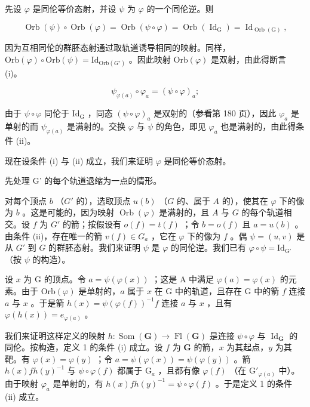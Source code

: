先设 \(\varphi\) 是同伦等价态射，并设 \(\psi\) 为 \(\varphi\) 的一个同伦逆。则

\[
\operatorname{Orb} (\psi) \circ \operatorname{Orb} (\varphi) = \operatorname{Orb} (\psi \circ \varphi) = \operatorname{Orb} (\operatorname{Id} _ {\mathrm{G}}) = \operatorname{Id} _ {\operatorname{Orb} (\mathrm{G})},
\]

因为互相同伦的群胚态射通过取轨道诱导相同的映射。同样，\(\mathrm{Orb}(\varphi) \circ \mathrm{Orb}(\psi) = \mathrm{Id}_{\mathrm{Orb}(G')}\) 。因此映射 \(\mathrm{Orb}(\varphi)\) 是双射，由此得断言 (i)。

\[
\psi_ {\varphi (a)} \circ \varphi_ {a} = (\psi \circ \varphi) _ {a};
\]

由于 \(\psi \circ \varphi\) 同伦于 \(\mathrm{Id}_{\mathrm{G}}\) ，同态 \((\psi \circ \varphi)_a\) 是双射的（参看第 180 页），因此 \(\varphi_a\) 是单射的而 \(\psi_{\varphi(a)}\) 是满射的。交换 \(\varphi\) 与 \(\psi\) 的角色，即见 \(\varphi_a\) 也是满射的，由此得条件 (ii)。

现在设条件 (i) 与 (ii) 成立，我们来证明 \(\varphi\) 是同伦等价态射。

先处理 G' 的每个轨道退缩为一点的情形。

对每个顶点 \(b\) （\(G'\) 的），选取顶点 \(u(b)\) （\(G\) 的、属于 \(A\) 的），使其在 \(\varphi\) 下的像为 \(b\) 。这是可能的，因为映射 \(\operatorname{Orb}(\varphi)\) 是满射的，且 \(A\) 与 \(G\) 的每个轨道相交。设 \(f\) 为 \(G'\) 的箭；按假设有 \(o(f) = t(f)\) ；令 \(b = o(f)\) 且 \(a = u(b)\) 。由条件 (ii)，存在唯一的箭 \(v(f) \in G_a\) ，它在 \(\varphi\) 下的像为 \(f\) 。偶 \(\psi = (u, v)\) 是从 \(G'\) 到 \(G\) 的群胚态射。我们来证明 \(\psi\) 是 \(\varphi\) 的同伦逆。我们已有 \(\varphi \circ \psi = \mathrm{Id}_{\mathrm{G}'}\) （按 \(\psi\) 的构造）。

设 \(x\) 为 G 的顶点。令 \(a = \psi(\varphi(x))\) ；这是 A 中满足 \(\varphi(a) = \varphi(x)\) 的元素。由于 \(\mathrm{Orb}(\varphi)\) 是单射的，\(a\) 属于 \(x\) 在 G 中的轨道，且存在 G 中的箭 \(f\) 连接 \(a\) 与 \(x\) 。于是箭 \(h(x) = \psi(\varphi(f))^{-1}f\) 连接 \(a\) 与 \(x\) ，且有 \(\varphi(h(x)) = e_{\varphi(a)}\) 。

我们来证明这样定义的映射 \(h \colon \operatorname{Som}(\mathbf{G}) \to \operatorname{Fl}(\mathbf{G})\) 是连接 \(\psi \circ \varphi\) 与 \(\operatorname{Id}_{\mathbf{G}}\) 的同伦。按构造，定义 1 的条件 (i) 成立。设 \(f\) 为 \(\mathbf{G}\) 的箭，\(x\) 为其起点，\(y\) 为其靶。有 \(\varphi(x) = \varphi(y)\) ；令 \(a = \psi(\varphi(x)) = \psi(\varphi(y))\) 。箭 \(h(x)fh(y)^{-1}\) 与 \(\psi \circ \varphi(f)\) 都属于 \(\mathrm{G}_a\) ，且都有像 \(\varphi(f)\) （在 \(\mathrm{G}'_{\varphi(a)}\) 中）。由于映射 \(\varphi_a\) 是单射的，有 \(h(x)fh(y)^{-1} = \psi \circ \varphi(f)\) 。于是定义 1 的条件 (ii) 成立。

